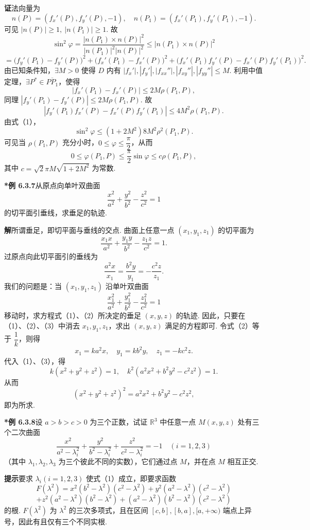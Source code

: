 \documentclass[UTF8, 12pt, fontset=fandol, oneside]{ctexart}
\begin{document}
\noindent\textbf{证}\quad 法向量为
\[
  n(P)=(f_x'(P),f_y'(P),-1),\quad
  n(P_1)=(f_x'(P_1),f_y'(P_1),-1).
\]
可见 $|n(P)|\ge1,\ |n(P_1)|\ge1$. 故
\[
  \sin^2\varphi
  =\frac{|n(P_1)\times n(P)|^2}{|n(P_1)|^2|n(P)|^2}
  \le |n(P_1)\times n(P)|^2
\]
\[
  =
  \bigl(f_y'(P_1)-f_y'(P)\bigr)^2+
  \bigl(f_x'(P_1)-f_x'(P)\bigr)^2+
  \bigl(f_x'(P_1)f_y'(P)-f_x'(P)f_y'(P_1)\bigr)^2. \tag{1}
\]
由已知条件知，$\exists M>0$ 使得 $D$ 内有 $|f_x'|,|f_y'|,|f_{xx}''|,|f_{xy}''|,|f_{yy}''|\le M$. 利用中值定理，$\exists P^*\in\overline{PP_1}$，使得
\[
  |f_x'(P_1)-f_x'(P)|
  \le2M\rho(P_1,P),
\]
同理 $|f_y'(P_1)-f_y'(P)|\le2M\rho(P_1,P)$. 故
\[
  |f_y'(P_1)f_x'(P)-f_x'(P)f_y'(P_1)|
  \le4M^2\rho(P_1,P).
\]
由式（1），
\[
  \sin^2\varphi\le(1+2M^2)8M^2\rho^2(P_1,P).
\]
可见当 $\rho(P_1,P)$ 充分小时，$0\le\varphi\le\dfrac\pi2$，从而
\[
  0\le\varphi(P_1,P)\le\frac\pi2\sin\varphi\le c\rho(P_1,P),
\]
其中 $c=\sqrt2\pi M\sqrt{1+2M^2}$ 为常数.

\noindent\textbf{*例 6.3.7}\quad 从原点向单叶双曲面
\[
  \frac{x^2}{a^2}+\frac{y^2}{b^2}-\frac{z^2}{c^2}=1
\]
的切平面引垂线，求垂足的轨迹.

\noindent\textbf{解}\quad 所谓垂足，即切平面与垂线的交点. 曲面上任意一点 $(x_1,y_1,z_1)$ 的切平面为
\[
  \frac{x_1x}{a^2}+\frac{y_1y}{b^2}-\frac{z_1z}{c^2}=1. \tag{1}
\]
过原点向此切平面引的垂线为
\[
  \frac{a^2x}{x_1}=\frac{b^2y}{y_1}=-\frac{c^2z}{z_1}. \tag{2}
\]
我们的问题是：当 $(x_1,y_1,z_1)$ 沿单叶双曲面
\[
  \frac{x_1^2}{a^2}+\frac{y_1^2}{b^2}-\frac{z_1^2}{c^2}=1 \tag{3}
\]
移动时，求方程式（1）、（2）所决定的垂足 $(x,y,z)$ 的轨迹. 因此，只要在（1）、（2）、（3）中消去 $x_1,y_1,z_1$，求出 $(x,y,z)$ 满足的方程即可. 令式（2）等于 $\dfrac1k$，则得
\[
  x_1=ka^2x,\quad y_1=kb^2y,\quad z_1=-kc^2z.
\]
代入（1）、（3），得
\[
  k(x^2+y^2+z^2)=1,\quad
  k^2(a^2x^2+b^2y^2-c^2z^2)=1.
\]
从而
\[
  (x^2+y^2+z^2)^2=a^2x^2+b^2y^2-c^2z^2,
\]
即为所求.

\noindent\textbf{*例 6.3.8}\quad 设 $a>b>c>0$ 为三个正数，试证 $\mathbb{R}^3$ 中任意一点 $M(x,y,z)$ 处有三个二次曲面
\[
  \frac{x^2}{a^2-\lambda_i^2}
  +\frac{y^2}{b^2-\lambda_i^2}
  +\frac{z^2}{c^2-\lambda_i^2}=-1
  \quad(i=1,2,3) \tag{1}
\]
（其中 $\lambda_1,\lambda_2,\lambda_3$ 为三个彼此不同的实数），它们通过点 $M$，并在点 $M$ 相互正交.

\noindent\textbf{提示}\quad 要求 $\lambda_i(i=1,2,3)$ 使式（1）成立，即要求函数
\[
  F(\lambda^2)=x^2(b^2-\lambda^2)(c^2-\lambda^2)
  +y^2(a^2-\lambda^2)(c^2-\lambda^2)
\]
\[
  +z^2(a^2-\lambda^2)(b^2-\lambda^2)
  +(a^2-\lambda^2)(b^2-\lambda^2)(c^2-\lambda^2)
\]
的根. $F(\lambda^2)$ 为 $\lambda^2$ 的三次多项式，且在区间 $[c,b],[b,a],[a,+\infty)$ 端点上异号，因此有且仅有三个不同实根.
\end{document}

